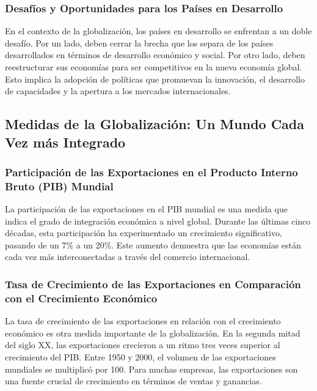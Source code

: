 \documentclass[
  jou,
  floatsintext,
  longtable,
  a4paper,
  nolmodern,
  notxfonts,
  notimes,
  12pt,
  colorlinks=true,linkcolor=blue,citecolor=blue,urlcolor=blue]{apa7}
\begin{document}
\subsubsection{Desafíos y Oportunidades para los Países en
Desarrollo}\label{desafuxedos-y-oportunidades-para-los-pauxedses-en-desarrollo}

En el contexto de la globalización, los países en desarrollo se
enfrentan a un doble desafío. Por un lado, deben cerrar la brecha que
los separa de los países desarrollados en términos de desarrollo
económico y social. Por otro lado, deben reestructurar sus economías
para ser competitivos en la nueva economía global. Esto implica la
adopción de políticas que promuevan la innovación, el desarrollo de
capacidades y la apertura a los mercados internacionales.

\subsection{Medidas de la Globalización: Un Mundo Cada Vez más
Integrado}\label{medidas-de-la-globalizaciuxf3n-un-mundo-cada-vez-muxe1s-integrado}

\subsubsection{Participación de las Exportaciones en el Producto Interno
Bruto (PIB)
Mundial}\label{participaciuxf3n-de-las-exportaciones-en-el-producto-interno-bruto-pib-mundial}

La participación de las exportaciones en el PIB mundial es una medida
que indica el grado de integración económica a nivel global. Durante las
últimas cinco décadas, esta participación ha experimentado un
crecimiento significativo, pasando de un 7\% a un 20\%. Este aumento
demuestra que las economías están cada vez más interconectadas a través
del comercio internacional.

\subsubsection{Tasa de Crecimiento de las Exportaciones en Comparación
con el Crecimiento
Económico}\label{tasa-de-crecimiento-de-las-exportaciones-en-comparaciuxf3n-con-el-crecimiento-econuxf3mico}

La tasa de crecimiento de las exportaciones en relación con el
crecimiento económico es otra medida importante de la globalización. En
la segunda mitad del siglo XX, las exportaciones crecieron a un ritmo
tres veces superior al crecimiento del PIB. Entre 1950 y 2000, el
volumen de las exportaciones mundiales se multiplicó por 100. Para
muchas empresas, las exportaciones son una fuente crucial de crecimiento
en términos de ventas y ganancias.
\end{document}
